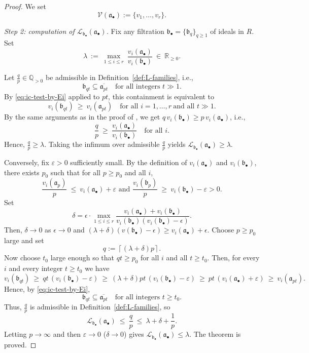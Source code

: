 \documentclass[10pt,a4paper]{amsart}
\newcommand{\Loj}{\mathcal{L}} %
\newcommand{\QQ}{\mathbb{Q}}
\newcommand{\RR}{\mathbb{R}}
\newcommand{\abul}{{\a_\bullet}}
\newcommand{\bbul}{{\b_\bullet}}
\renewcommand{\a}{\mathfrak{a}}
\renewcommand{\b}{\mathfrak{b}}
\begin{document}
\begin{proof}
	We set
	\[
	\mathcal V(\abul):=\{v_1,\dots,v_r\}.
	\]
		
		\smallskip
		\noindent\textit{Step 2: computation of $\Loj_{\bbul}(\abul)$.}
		Fix any filtration $\bbul=\{\b_q\}_{q\ge 1}$ of ideals in $R$.
		Set
		\[
		\lambda\ :=\ \max_{1\le i\le r}\ \frac{v_i(\abul)}{v_i(\bbul)}\ \in\ \RR_{\ge 0}.
		\]
	
		Let $\frac{q}{p}\in\QQ_{>0}$ be admissible in Definition~\ref{def:L-families}, i.e.,
		\[
		\b_{qt}\subseteq \overline{\a_{pt}}
		\quad\text{for all integers }t\gg 1.
		\]
		By \eqref{eq:ic-test-by-Ei} applied to $pt$, this containment is equivalent to
		\[
		v_i(\b_{qt})\ \ge\ v_i(\a_{pt})
		\quad\text{for all }i=1,\dots,r\ \text{and all }t\gg 1.
		\]
		By the same arguments as in the proof of , we get
	$q\,v_i(\bbul)\ge p\,v_i(\abul)$, i.e.,
		\[
		\frac{q}{p}\ \ge\ \frac{v_i(\abul)}{v_i(\bbul)}\quad\text{for all } i.
		\]
	Hence, $\frac{q}{p}\ge \lambda$. Taking the infimum over admissible \(\frac{q}{p}\) yields
		\(\Loj_{\bbul}(\abul)\ge \lambda\).
		
		Conversely, fix $\varepsilon>0$ sufficiently small. 
		By the definition of $v_i(\abul)$ and $v_i(\bbul)$, there exists $p_0$
		such that for all $p\ge p_0$ and all $i$,
		\[
		\frac{v_i(\a_p)}{p}\ \le\ v_i(\abul)+\varepsilon
	\text{ and }
		\frac{v_i(\b_p)}{p}\ \ge\ v_i(\bbul)-\varepsilon > 0.
		\]
    Set $$\delta = \epsilon \cdot \max\limits_{1 \le i \le r}\frac{v_i(\abul) + v_i(\bbul)}{v_i(\bbul)(v_i(\bbul)-\epsilon)}.$$
    Then, $\delta \rightarrow 0$ as $\epsilon \rightarrow 0$ and 
    $(\lambda + \delta)(v(\bbul)-\epsilon) \ge v_i(\abul)+\epsilon.$
		Choose $p\ge p_0$ large and set
		$$q:=\left\lceil(\lambda+\delta)p\right\rceil.$$
		Now choose $t_0$ large enough so that $qt\ge p_0$ for all $i$ and all $t\ge t_0$.
		Then, for every $i$ and every integer $t\ge t_0$ we have
		\[
		v_i(\b_{qt})\ \ge\ qt\,(v_i(\bbul)-\varepsilon)
		\ \ge\ (\lambda+\delta)pt\,(v_i(\bbul)-\varepsilon)
		\ \ge\ pt\,(v_i(\abul)+\varepsilon)
		\ \ge\ v_i(\a_{pt}).
		\]
		Hence, by \eqref{eq:ic-test-by-Ei},
		\[
		\b_{qt}\subseteq \overline{\a_{pt}}
		\quad\text{for all integers }t\ge t_0.
		\]
		Thus, $\frac{q}{p}$ is admissible in Definition~\ref{def:L-families}, so
		\[
		\Loj_{\bbul}(\abul)\ \le\ \frac{q}{p}\ \le\ \lambda+\delta+\frac{1}{p}.
		\]
		Letting $p\to\infty$ and then $\varepsilon\to 0$ ($\delta \to 0$) gives $\Loj_{\bbul}(\abul)\le \lambda$.
		The theorem is proved.
	\end{proof}
\end{document}
